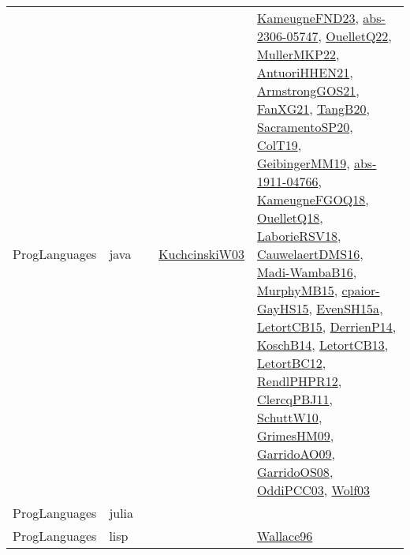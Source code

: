 {\begin{longtable}{llp{6cm}p{6cm}p{6cm}}
ProgLanguages & java  &  & \href{articles/KuchcinskiW03.pdf}{KuchcinskiW03}\cite{KuchcinskiW03} & \href{papers/KameugneFND23.pdf}{KameugneFND23}\cite{KameugneFND23}, \href{articles/abs-2306-05747.pdf}{abs-2306-05747}\cite{abs-2306-05747}, \href{papers/OuelletQ22.pdf}{OuelletQ22}\cite{OuelletQ22}, \href{articles/MullerMKP22.pdf}{MullerMKP22}\cite{MullerMKP22}, \href{papers/AntuoriHHEN21.pdf}{AntuoriHHEN21}\cite{AntuoriHHEN21}, \href{papers/ArmstrongGOS21.pdf}{ArmstrongGOS21}\cite{ArmstrongGOS21}, \href{articles/FanXG21.pdf}{FanXG21}\cite{FanXG21}, \href{papers/TangB20.pdf}{TangB20}\cite{TangB20}, \href{articles/SacramentoSP20.pdf}{SacramentoSP20}\cite{SacramentoSP20}, \href{papers/ColT19.pdf}{ColT19}\cite{ColT19}, \href{papers/GeibingerMM19.pdf}{GeibingerMM19}\cite{GeibingerMM19}, \href{articles/abs-1911-04766.pdf}{abs-1911-04766}\cite{abs-1911-04766}, \href{papers/KameugneFGOQ18.pdf}{KameugneFGOQ18}\cite{KameugneFGOQ18}, \href{papers/OuelletQ18.pdf}{OuelletQ18}\cite{OuelletQ18}, \href{articles/LaborieRSV18.pdf}{LaborieRSV18}\cite{LaborieRSV18}, \href{papers/CauwelaertDMS16.pdf}{CauwelaertDMS16}\cite{CauwelaertDMS16}, \href{papers/Madi-WambaB16.pdf}{Madi-WambaB16}\cite{Madi-WambaB16}, \href{papers/MurphyMB15.pdf}{MurphyMB15}\cite{MurphyMB15}, \href{papers/cpaior-GayHS15.pdf}{cpaior-GayHS15}\cite{cpaior-GayHS15}, \href{articles/EvenSH15a.pdf}{EvenSH15a}\cite{EvenSH15a}, \href{articles/LetortCB15.pdf}{LetortCB15}\cite{LetortCB15}, \href{papers/DerrienP14.pdf}{DerrienP14}\cite{DerrienP14}, \href{papers/KoschB14.pdf}{KoschB14}\cite{KoschB14}, \href{papers/LetortCB13.pdf}{LetortCB13}\cite{LetortCB13}, \href{papers/LetortBC12.pdf}{LetortBC12}\cite{LetortBC12}, \href{papers/RendlPHPR12.pdf}{RendlPHPR12}\cite{RendlPHPR12}, \href{papers/ClercqPBJ11.pdf}{ClercqPBJ11}\cite{ClercqPBJ11}, \href{papers/SchuttW10.pdf}{SchuttW10}\cite{SchuttW10}, \href{papers/GrimesHM09.pdf}{GrimesHM09}\cite{GrimesHM09}, \href{articles/GarridoAO09.pdf}{GarridoAO09}\cite{GarridoAO09}, \href{articles/GarridoOS08.pdf}{GarridoOS08}\cite{GarridoOS08}, \href{papers/OddiPCC03.pdf}{OddiPCC03}\cite{OddiPCC03}, \href{papers/Wolf03.pdf}{Wolf03}\cite{Wolf03}\\
ProgLanguages & julia  &  &  & \\
ProgLanguages & lisp &  &  & \href{articles/Wallace96.pdf}{Wallace96}\cite{Wallace96}\\

\end{longtable}}
